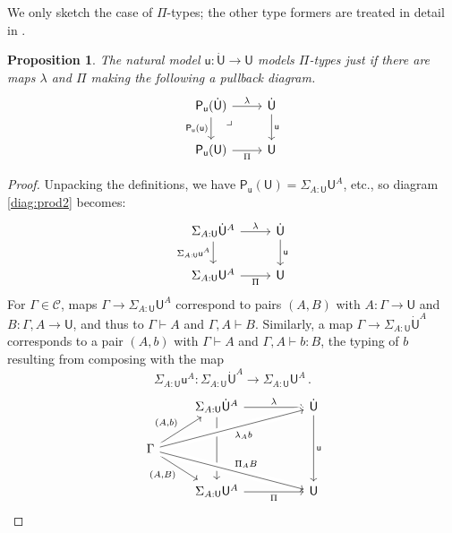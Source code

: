 \documentclass[12pt,reqno]{amsart}
\newcommand{\CC}{\ensuremath{\mathcal{C}}}
\newcommand{\alg}[1]{\ensuremath{\mathsf{#1}}}
\renewcommand{\to}{\ensuremath{\rightarrow}}
\newcommand{\G}{\ensuremath{\Gamma}}
\newcommand{\ext}[2]{{#1,#2}}
\renewcommand{\t}{\ensuremath{\mathsf{u}}}
\newcommand{\T}{\ensuremath{\mathsf{U}}}
\newcommand{\TT}{\ensuremath{\dot{\mathsf{U}}}}
\newcommand{\tT}{\ensuremath{{\t}:\TT\to\T}}
\newcommand{\pbcorner}{\arrow[dr,phantom,"\lrcorner" very near start, shift right=.5ex]} %
\newtheorem{proposition}[theorem]{Proposition}
\theoremstyle{remark}
\theoremstyle{definition}
\begin{document}
We only sketch the case of $\Pi$-types; the other type formers are treated in detail in \cite{awodey:NM, Newstead:thesis, NA:2018}.

\begin{proposition}  The natural model $\tT$ models $\Pi$-types just if there are maps $\lambda$ and $\Pi$ making the following a pullback diagram. 
\begin{equation}\label{diag:prod2}
\begin{tikzcd}
\alg{P}_\t(\TT)  \ar[d,swap, "{\alg{P}_\t(\t)}"]   \ar[r, "\lambda"]  \pbcorner &  \TT \ar[d, "{\t}"]\\
\alg{P}_\t(\T)	\ar[r,swap, "{\Pi}"] & \T
\end{tikzcd}
\end{equation}
\end{proposition}
%
\begin{proof}
Unpacking the definitions, we have $\alg{P}_\t(\T) = \Sigma_{A:\T} \T^A $, etc.,  
so diagram \eqref{diag:prod2} becomes:
\begin{equation*}
\begin{tikzcd}
\Sigma_{A:\T} \TT^A \ar[d,swap, "{\Sigma_{A:\T} \t^A}"]  \ar[r, "{\lambda}"] &  \TT \ar[d,"{\t}"] \\
\Sigma_{A:\T} \T^A    \ar[r, swap,"{\Pi}"] & \T
\end{tikzcd}
\end{equation*}
For $\G \in \CC$, maps $\G\to \Sigma_{A:\T} \T^A $ correspond to pairs $(A,B)$ with  $A:\G\to \T$ and $B : \ext{\G}{A} \to \T$, and thus to $\G\vdash A$ and $\ext{\G}{A} \vdash B$. Similarly, a map $\G\to \Sigma_{A:\T} \TT^A $ corresponds to a pair $(A,b)$ with $\G\vdash A$ and $\ext{\G}{A} \vdash b : B$, the typing of $b$ resulting from composing with the map 
\[
\Sigma_{A:\T} \t^A : \Sigma_{A:\T} \TT^A \to \Sigma_{A:\T} \T^A\,.
\]
\begin{equation*}
\begin{tikzcd}
	& \Sigma_{A:\T} \TT^A \ar[dd]  \ar[rr, "{\lambda}"] &&  \TT \ar[dd,"{\t}"] \\
\G \ar[dr,swap, "{(A,B)}"] \ar[ru, "{(A,b)}"] \ar[urrr, swap, crossing over, "{ \lambda_{A}b }"] \ar[drrr, crossing over, "{ \Pi_{A}B }"] &&& \\
 	& \Sigma_{A:\T}\T^A    \ar[rr, swap,"{\Pi}"] && \T 
\end{tikzcd}

\end{equation*}
\end{proof}
\end{document}
